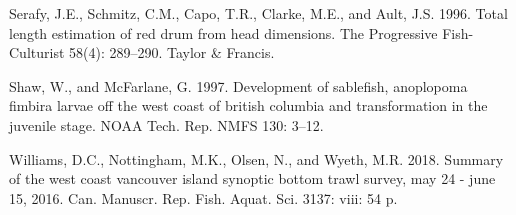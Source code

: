 \documentclass[12pt]{article}\usepackage[]{graphicx}\usepackage[]{color}
\begin{document}
\begin{CSLReferences}{1}{0}
%
Serafy, J.E., Schmitz, C.M., Capo, T.R., Clarke, M.E., and Ault, J.S. 1996. Total length estimation of red drum from head dimensions. The Progressive Fish-Culturist 58(4): 289--290. Taylor \& Francis.

%
Shaw, W., and McFarlane, G. 1997. Development of sablefish, anoplopoma fimbira larvae off the west coast of british columbia and transformation in the juvenile stage. NOAA Tech. Rep. NMFS 130: 3--12.

%
Williams, D.C., Nottingham, M.K., Olsen, N., and Wyeth, M.R. 2018. Summary of the west coast vancouver island synoptic bottom trawl survey, may 24 - june 15, 2016. Can. Manuscr. Rep. Fish. Aquat. Sci. 3137: viii: 54 p.

\end{CSLReferences}
\end{document}
